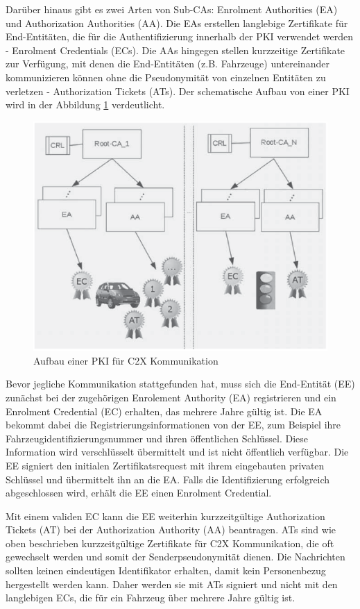 Darüber hinaus gibt es zwei Arten von Sub-CAs: Enrolment Authorities (EA) und Authorization Authorities (AA). Die EAs erstellen langlebige Zertifikate für End-Entitäten, die für die Authentifizierung innerhalb der PKI verwendet werden - Enrolment Credentials (ECs). Die AAs hingegen stellen kurzzeitige Zertifikate zur Verfügung, mit denen die End-Entitäten (z.B. Fahrzeuge) untereinander kommunizieren können ohne die Pseudonymität von einzelnen Entitäten zu verletzen - Authorization Tickets (ATs). Der schematische Aufbau von einer PKI wird in der Abbildung \ref{fig:pki} verdeutlicht.

\begin{figure}
	\centering
	\includegraphics[width=0.7\linewidth]{images/PKI}
	\caption[Aufbau einer PKI für C2X Kommunikation]{Aufbau einer PKI für C2X Kommunikation\footnotemark}
	\label{fig:pki}
\end{figure}

Bevor jegliche Kommunikation stattgefunden hat, muss sich die End-Entität (EE) zunächst bei der zugehörigen Enrolement Authority (EA) registrieren und ein Enrolment Credential (EC) erhalten, das mehrere Jahre gültig ist. Die EA bekommt dabei die Registrierungsinformationen von der EE, zum Beispiel ihre Fahrzeugidentifizierungsnummer und ihren öffentlichen Schlüssel. Diese Information wird verschlüsselt übermittelt und ist nicht öffentlich verfügbar. Die EE signiert den initialen Zertifikatsrequest mit ihrem eingebauten privaten Schlüssel und übermittelt ihn an die EA. Falls die Identifizierung erfolgreich abgeschlossen wird, erhält die EE einen Enrolment Credential.

Mit einem validen EC kann die EE weiterhin kurzzeitgültige Authorization Tickets (AT) bei der Authorization Authority (AA) beantragen. ATs sind wie oben beschrieben kurzzeitgültige Zertifikate für C2X Kommunikation, die oft gewechselt werden und somit der Senderpseudonymität dienen. Die Nachrichten sollten keinen eindeutigen Identifikator erhalten, damit kein Personenbezug hergestellt werden kann. Daher werden sie mit ATs signiert und nicht mit den langlebigen ECs, die für ein Fahrzeug über mehrere Jahre gültig ist. 

